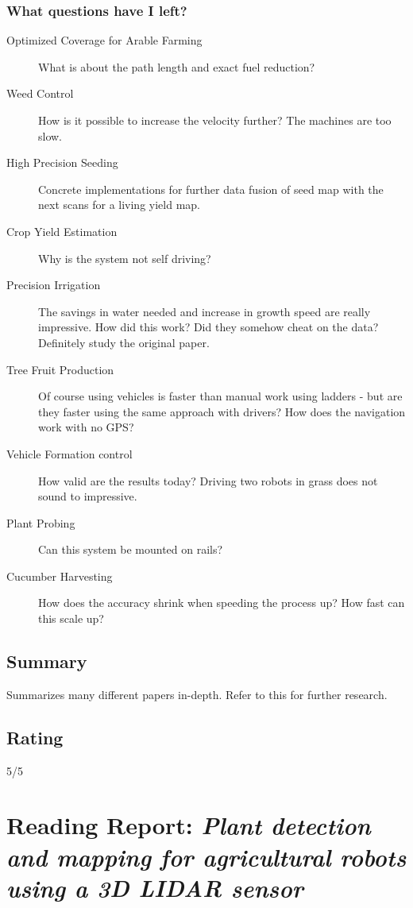 \documentclass{article}
\begin{document}
\subsubsection*{What questions have I left?}
\begin{description}

    \item[Optimized Coverage for Arable Farming] What is about the path length and exact fuel reduction?
    \item[Weed Control] How is it possible to increase the velocity further? The machines are too slow.
    \item[High Precision Seeding] Concrete implementations for further data fusion of seed map with the next scans for a living yield map.
    \item[Crop Yield Estimation] Why is the system not self driving?
    \item[Precision Irrigation] The savings in water needed and increase in growth speed are really impressive. How did this work? Did they somehow cheat on the data?
    Definitely study the original paper. 
    \item[Tree Fruit Production] Of course using vehicles is faster than manual work using ladders - but are they faster using the same approach with drivers? How does the navigation work with no GPS?
    \item[Vehicle Formation control] How valid are the results today? Driving two robots in grass does not sound to impressive.
    \item[Plant Probing] Can this system be mounted on rails?
    \item[Cucumber Harvesting] How does the accuracy shrink when speeding the process up? How fast can this scale up? 

\end{description} 


\subsection*{Summary} 
Summarizes many different papers in-depth. Refer to this for further research.

\subsection*{Rating}
5/5

\section{Reading Report: \emph{Plant detection and mapping for agricultural robots using a 3D LIDAR sensor}}
\cite{Weiss2011}
\end{document}

